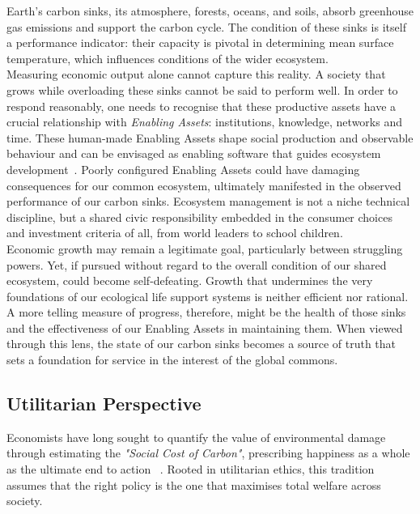 \documentclass[12pt, oneside]{article}   	%
\begin{document}
Earth’s carbon sinks, its atmosphere, forests, oceans, and soils, absorb greenhouse gas emissions and support the carbon cycle.
The condition of these sinks is itself a performance indicator: their capacity is pivotal in determining mean surface temperature, which influences conditions of the wider ecosystem.\\
Measuring economic output alone cannot capture this reality.
A society that grows while overloading these sinks cannot be said to perform well.
In order to respond reasonably, one needs to recognise that these productive assets have a crucial relationship with \emph{Enabling Assets}: institutions, knowledge, networks and time.
These human-made Enabling Assets shape social production and observable behaviour and can be envisaged as enabling software that guides ecosystem development~\cite{pd3}.
Poorly configured Enabling Assets could have damaging consequences for our common ecosystem, ultimately manifested in the observed performance of our carbon sinks.
Ecosystem management is not a niche technical discipline, but a shared civic responsibility embedded in the consumer choices and investment criteria of all, from world leaders to school children.\\

Economic growth may remain a legitimate goal, particularly between struggling powers.
Yet, if pursued without regard to the overall condition of our shared ecosystem, could become self-defeating.
Growth that undermines the very foundations of our ecological life support systems is neither efficient nor rational.
A more telling measure of progress, therefore, might be the health of those sinks and the effectiveness of our Enabling Assets in maintaining them.
When viewed through this lens, the state of our carbon sinks becomes a source of truth that sets a foundation for service in the interest of the global commons.\\

\subsection{Utilitarian Perspective}

Economists have long sought to quantify the value of environmental damage through estimating the \emph{"Social Cost of Carbon"}, prescribing happiness as a whole as the ultimate end to action ~\cite{hs1}.
Rooted in utilitarian ethics, this tradition assumes that the right policy is the one that maximises total welfare across society.\\
\end{document}
